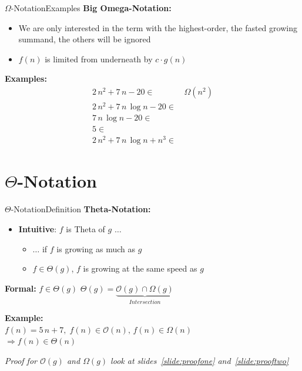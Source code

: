 \begin{frame}{$\Omega$-Notation}{Examples}
  \textbf{Big Omega-Notation:}
  \begin{itemize}
    \item
      We are only interested in the term with the highest-order,
      the fasted growing summand, the others will be ignored
    \item
      $f(n)$ is limited {\color{Mittel-Blau}from underneath} by
      $c \cdot g(n)$
  \end{itemize}
  \textbf{Examples:}
  \begin{align*}
    2 \, n^2 + 7 \, n - 20 \in & \,\Omega(n^2)\\
    2 \, n^2 + 7 \, n \, \log n - 20 \in & {}\\
    7 \, n \, \log n - 20 \in & {}\\
    5 \in & {}\\
    2 \, n^2 + 7 \, n \, \log n + n^3 \in & {}
  \end{align*}
\end{frame}


\section{\texorpdfstring{$\Theta$}{Theta}-Notation}

\begin{frame}{$\Theta$-Notation}{Definition}
  \textbf{Theta-Notation:}
  \begin{itemize}
    \item
      \textbf{Intuitive}: $f$ is Theta of $g$ $\ldots$
      \begin{itemize}
        \item
          $\ldots$ if $f$ is growing as much as $g$
        \item
          $f \in \Theta(g)$, $f$ is growing at the same speed as $g$
       \end{itemize}
  \end{itemize}
  \begin{block}{\textbf{Formal:} $f \in \Theta(g)$}
    $\Theta(g) = \underbrace{\mathcal O(g) \cap \Omega(g)}_{Intersection}$
  \end{block}
  \textbf{Example:}\\
  \hspace*{1.5em}$f(n) = 5 \, n + 7, \;
    f(n) \in \mathcal{O}(n), \,
    f(n) \in \Omega(n)$\\
  \hspace*{3.0em}$\Rightarrow f(n) \in \Theta(n)$\\[0.5em]
  \begin{center}
   \textit{Proof for $\mathcal{O}(g)$ and $\Omega(g)$ look at
     slides~\ref{slide:proofone} and~\ref{slide:prooftwo}}
  \end{center}
\end{frame}

